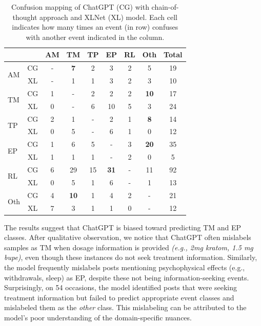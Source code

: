 \documentclass[letterpaper]{article}
\begin{document}
\begin{itemize}
\begin{table}[h!]
\renewcommand*{\arraystretch}{0.91}
\centering
\footnotesize
\begin{tabular}
{lc|cccccc|c}
& &{\textbf{AM}}& {\textbf{TM}}& {\textbf{TP}} & {\textbf{EP}} & {\textbf{RL}} & \textbf{Oth} & Total\\
\midrule
\multirow{2}{*}{AM} & CG &-  & \textbf{7} & 2 & 3 & 2 & 5 & 19\\
& XL & - & 1 & 1 & 3 & 2 & 3 & 10 \\
\midrule

\multirow{2}{*}{TM} &CG & 1 & - & 2 & 2 & 2 & \textbf{10} & 17\\
& XL& 0 & - & 6 & {10} & 5 & 3 & {24} \\

\midrule
\multirow{2}{*}{TP} &CG & 2 & 1 & - & 2 & 1 & \textbf{8}  & 14\\
&XL & 0 & 5 & - & 6 & 1 & 0 & 12 \\
\midrule
\multirow{2}{*}{EP} &CG & 1 & 6 & 5 & - & 3 & \textbf{20} & 35\\
& XL & 1 & 1 & 1 & - & 2 & 0 & 5 \\
\midrule
\multirow{2}{*}{RL} &CG & 6 & 29 & 15 & \textbf{31} & - & 11 & 92\\
&XL & 0 & 5 & 1 & 6 & - & 1 & 13 \\

\midrule
\multirow{2}{*}{Oth} &CG & 4 & \textbf{10} & 1 & 4 & 2 & - & 21\\
&XL & 7 & 3 & 1 & 1 & 0 & - & 12 \\
\hline

\end{tabular}
\caption{Confusion mapping of ChatGPT (CG) with chain-of-thought approach and XLNet (XL) model. Each cell indicates how many times an event (in row) confuses with another event indicated in the column.
}
\label{confusion-table}
\end{table}



The results suggest that ChatGPT is biased toward predicting TM and EP classes. After qualitative observation, we notice that ChatGPT often mislabels samples as TM when dosage information is provided \textit{(e.g., 2mg kratom, 1.5 mg bupe)}, even though these instances do not seek treatment information. Similarly, the model frequently mislabels posts mentioning psychophysical effects (e.g., withdrawals, sleep) as EP, despite these not being information-seeking events. Surprisingly, on 54 occasions, the model identified posts that were seeking treatment information but failed to predict appropriate event classes and mislabeled them as the \textit{other} class. This mislabeling can be attributed to the model's poor understanding of the domain-specific nuances.
\end{itemize}
\end{document}
